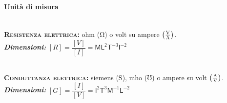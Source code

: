 \paragraph{Unità di misura}
\begin{units}~\\
	\textbf{\textsc{Resistenza elettrica:}} ohm ($\unit{\ohm}$) o volt su ampere $\left(\unit[per-mode = fraction]{\volt\per\ampere}\right)$.\\
	\textit{\textbf{Dimensioni:}} $[R]=\dfrac{[V]}{[I]}=\mathsf{M} \mathsf{L}^2  \mathsf{T}^{-3}\mathsf{I}^{-2}$
\end{units}
\begin{units}~\\
	\textbf{\textsc{Conduttanza elettrica:}} siemens ($\unit{\siemens}$), mho  ($\mho$) o ampere su volt $\left(\unit[per-mode = fraction]{\ampere\per\volt}\right)$.\\
	\textit{\textbf{Dimensioni:}} $[G]=\dfrac{[I]}{[V]}=\mathsf{I}^{2}\mathsf{T}^{3}\mathsf{M}^{-1} \mathsf{L}^{-2}$
\end{units}
